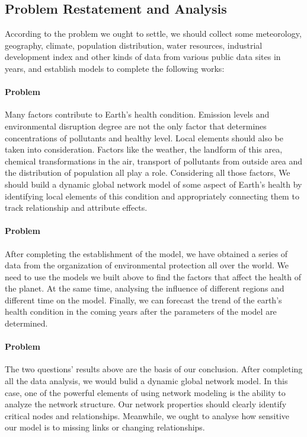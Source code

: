 \documentclass[a4paper,11pt]{article}
\begin{document}
\subsection{Problem Restatement and Analysis}
\par According to the problem we ought to settle, we should collect some meteorology, geography, climate, population distribution, water resources, industrial development index and other kinds of data from various public data sites in years, and establish models to complete the following works:

\paragraph{Problem \uppercase\expandafter{}}Many factors contribute to Earth's health condition. Emission levels and environmental disruption degree are not the only factor that determines concentrations of pollutants and healthy level. Local elements should also be taken into consideration. Factors like the weather, the landform of this area, chemical transformations in the air, transport of pollutants from outside area and the distribution of population all play a role. Considering all those factors, We should build a dynamic global network model of some aspect of Earth's health by identifying local elements of this condition and appropriately connecting them to track relationship and attribute effects.

\paragraph{Problem \uppercase\expandafter{}}After completing the establishment of the model, we have obtained a series of data from the organization of environmental protection all over the world. We need to use the models we built above to find the factors that affect the health of the planet. At the same time, analysing the influence of different regions and different time on the model. Finally, we can forecast the trend of the earth's health condition in the coming years after the parameters of the model are determined.

\paragraph{Problem \uppercase\expandafter{}}The two questions' results above are the basis of our conclusion. After completing all the data analysis, we would bulid a dynamic global network model. In this case, one of the powerful elements of using network modeling is the ability to analyze the network structure. Our network properties should clearly identify critical nodes and relationships. Meanwhile, we ought to analyse how sensitive our model is to missing links or changing relationships.
\end{document}
